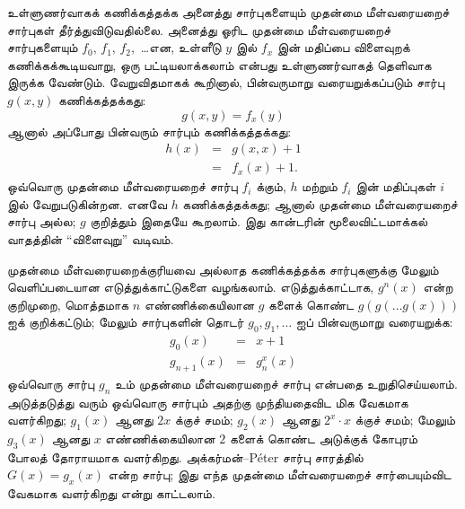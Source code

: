 \documentclass[../../../include/open-logic-section]{subfiles}
\begin{document}


உள்ளுணர்வாகக் கணிக்கத்தக்க அனைத்து சார்புகளையும் முதன்மை
மீள்வரையறைச் சார்புகள் தீர்த்துவிடுவதில்லை. அனைத்து ஓரிட முதன்மை
மீள்வரையறைச் சார்புகளையும் $f_0$, $f_1$, $f_2$,~\dots என,
உள்ளீடு $y$ இல் $f_x$ இன் மதிப்பை விளைவுறக் கணிக்கக்கூடியவாறு,
ஒரு பட்டியலாக்கலாம் என்பது உள்ளுணர்வாகத் தெளிவாக இருக்க வேண்டும்.
வேறுவிதமாகக் கூறினால், பின்வருமாறு வரையறுக்கப்படும் சார்பு $g(x,y)$
கணிக்கத்தக்கது:
\[
g(x,y) = f_x(y)
\]
ஆனால் அப்போது பின்வரும் சார்பும் கணிக்கத்தக்கது:
\begin{eqnarray*}
h(x) & = & g(x,x) + 1 \\
& = & f_x(x) +1.
\end{eqnarray*}
ஒவ்வொரு முதன்மை மீள்வரையறைச் சார்பு $f_i$ க்கும், $h$ மற்றும்
$f_i$ இன் மதிப்புகள் $i$ இல் வேறுபடுகின்றன. எனவே $h$
கணிக்கத்தக்கது; ஆனால் முதன்மை மீள்வரையறைச் சார்பு அல்ல;
$g$ குறித்தும் இதையே கூறலாம். இது கான்டரின் மூலைவிட்டமாக்கல்
வாதத்தின் “விளைவுறு” வடிவம்.

முதன்மை மீள்வரையறைக்குரியவை அல்லாத கணிக்கத்தக்க சார்புகளுக்கு மேலும்
வெளிப்படையான எடுத்துக்காட்டுகளை வழங்கலாம். எடுத்துக்காட்டாக,
$g^n(x)$ என்ற குறிமுறை, மொத்தமாக $n$ எண்ணிக்கையிலான $g$ களைக்
கொண்ட $g(g(\dots g(x)))$ ஐக் குறிக்கட்டும்; மேலும் சார்புகளின்
தொடர் $g_0,g_1,\dots$ ஐப் பின்வருமாறு வரையறுக்க:
\begin{eqnarray*}
g_0(x) & = & x+1 \\
g_{n + 1}(x) & = & g_n^x(x)
\end{eqnarray*}
ஒவ்வொரு சார்பு $g_n$ உம் முதன்மை மீள்வரையறைச் சார்பு என்பதை
உறுதிசெய்யலாம். அடுத்தடுத்து வரும் ஒவ்வொரு சார்பும் அதற்கு
முந்தியதைவிட மிக வேகமாக வளர்கிறது; $g_1(x)$ ஆனது $2x$ க்குச் சமம்;
$g_2(x)$ ஆனது $2^x \cdot x$ க்குச் சமம்; மேலும் $g_3(x)$ ஆனது
$x$ எண்ணிக்கையிலான $2$ களைக் கொண்ட அடுக்குக் கோபுரம் போலத்
தோராயமாக வளர்கிறது. அக்கர்மன்--P\'eter சார்பு சாரத்தில்
$G(x) = g_x(x)$ என்ற சார்பு; இது எந்த முதன்மை மீள்வரையறைச்
சார்பையும்விட வேகமாக வளர்கிறது என்று காட்டலாம்.
\end{document}
